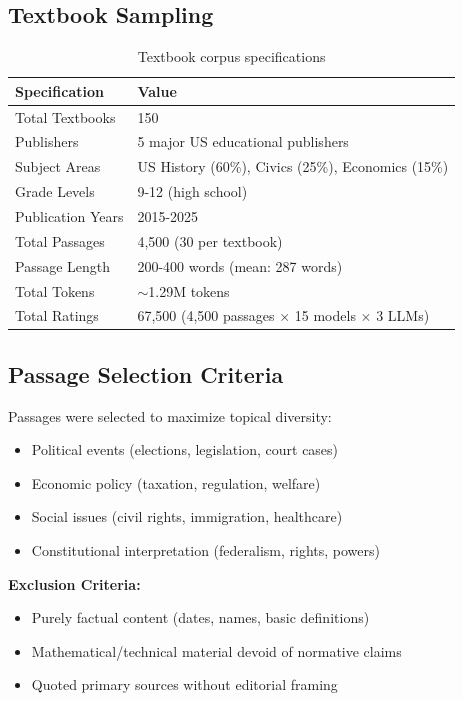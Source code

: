 \documentclass[11pt,a4paper]{article}
\begin{document}
\subsection{Textbook Sampling}

\begin{table}[H]
\centering
\caption{Textbook corpus specifications}
\begin{tabular}{ll}
\toprule
\textbf{Specification} & \textbf{Value} \\
\midrule
Total Textbooks & 150 \\
Publishers & 5 major US educational publishers \\
Subject Areas & US History (60\%), Civics (25\%), Economics (15\%) \\
Grade Levels & 9-12 (high school) \\
Publication Years & 2015-2025 \\
Total Passages & 4,500 (30 per textbook) \\
Passage Length & 200-400 words (mean: 287 words) \\
Total Tokens & $\sim$1.29M tokens \\
Total Ratings & 67,500 (4,500 passages $\times$ 15 models $\times$ 3 LLMs) \\
\bottomrule
\end{tabular}
\label{tab:corpus}
\end{table}

\subsection{Passage Selection Criteria}

Passages were selected to maximize topical diversity:
\begin{itemize}
    \item Political events (elections, legislation, court cases)
    \item Economic policy (taxation, regulation, welfare)
    \item Social issues (civil rights, immigration, healthcare)
    \item Constitutional interpretation (federalism, rights, powers)
\end{itemize}

\textbf{Exclusion Criteria:}
\begin{itemize}
    \item Purely factual content (dates, names, basic definitions)
    \item Mathematical/technical material devoid of normative claims
    \item Quoted primary sources without editorial framing
\end{itemize}
\end{document}
